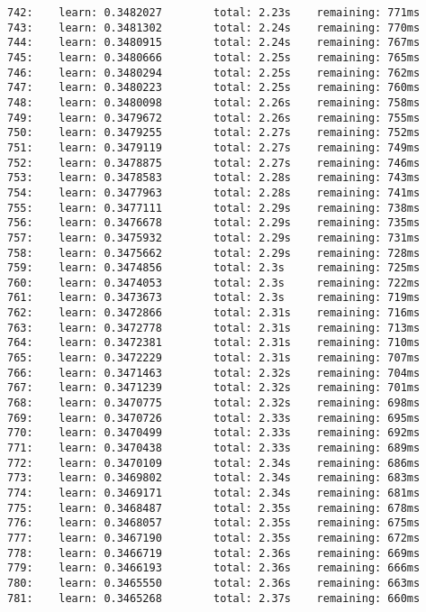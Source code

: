 \documentclass[11pt]{article}
\begin{document}
\begin{Verbatim}[commandchars=\\\{\}]
742:    learn: 0.3482027        total: 2.23s    remaining: 771ms
743:    learn: 0.3481302        total: 2.24s    remaining: 770ms
744:    learn: 0.3480915        total: 2.24s    remaining: 767ms
745:    learn: 0.3480666        total: 2.25s    remaining: 765ms
746:    learn: 0.3480294        total: 2.25s    remaining: 762ms
747:    learn: 0.3480223        total: 2.25s    remaining: 760ms
748:    learn: 0.3480098        total: 2.26s    remaining: 758ms
749:    learn: 0.3479672        total: 2.26s    remaining: 755ms
750:    learn: 0.3479255        total: 2.27s    remaining: 752ms
751:    learn: 0.3479119        total: 2.27s    remaining: 749ms
752:    learn: 0.3478875        total: 2.27s    remaining: 746ms
753:    learn: 0.3478583        total: 2.28s    remaining: 743ms
754:    learn: 0.3477963        total: 2.28s    remaining: 741ms
755:    learn: 0.3477111        total: 2.29s    remaining: 738ms
756:    learn: 0.3476678        total: 2.29s    remaining: 735ms
757:    learn: 0.3475932        total: 2.29s    remaining: 731ms
758:    learn: 0.3475662        total: 2.29s    remaining: 728ms
759:    learn: 0.3474856        total: 2.3s     remaining: 725ms
760:    learn: 0.3474053        total: 2.3s     remaining: 722ms
761:    learn: 0.3473673        total: 2.3s     remaining: 719ms
762:    learn: 0.3472866        total: 2.31s    remaining: 716ms
763:    learn: 0.3472778        total: 2.31s    remaining: 713ms
764:    learn: 0.3472381        total: 2.31s    remaining: 710ms
765:    learn: 0.3472229        total: 2.31s    remaining: 707ms
766:    learn: 0.3471463        total: 2.32s    remaining: 704ms
767:    learn: 0.3471239        total: 2.32s    remaining: 701ms
768:    learn: 0.3470775        total: 2.32s    remaining: 698ms
769:    learn: 0.3470726        total: 2.33s    remaining: 695ms
770:    learn: 0.3470499        total: 2.33s    remaining: 692ms
771:    learn: 0.3470438        total: 2.33s    remaining: 689ms
772:    learn: 0.3470109        total: 2.34s    remaining: 686ms
773:    learn: 0.3469802        total: 2.34s    remaining: 683ms
774:    learn: 0.3469171        total: 2.34s    remaining: 681ms
775:    learn: 0.3468487        total: 2.35s    remaining: 678ms
776:    learn: 0.3468057        total: 2.35s    remaining: 675ms
777:    learn: 0.3467190        total: 2.35s    remaining: 672ms
778:    learn: 0.3466719        total: 2.36s    remaining: 669ms
779:    learn: 0.3466193        total: 2.36s    remaining: 666ms
780:    learn: 0.3465550        total: 2.36s    remaining: 663ms
781:    learn: 0.3465268        total: 2.37s    remaining: 660ms

\end{Verbatim}
\end{document}
